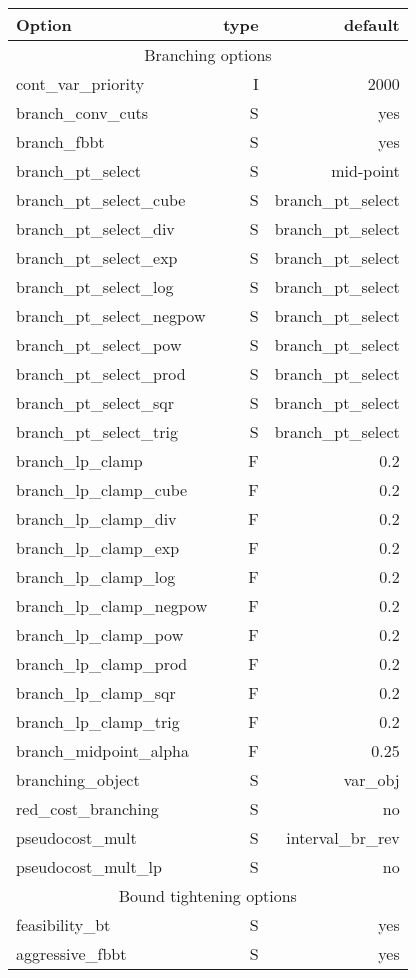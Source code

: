 \begin{center}
\begin{tabular}{|l|r|r|}\hline
Option & type &  default \\
\hline
\hline
\multicolumn{3}{|c|}{Branching options}\\
\hline
cont\_var\_priority& I& 2000\\
branch\_conv\_cuts& S& yes\\
branch\_fbbt& S& yes\\
branch\_pt\_select& S& mid-point\\
branch\_pt\_select\_cube& S& branch\_pt\_select\\
branch\_pt\_select\_div& S& branch\_pt\_select\\
branch\_pt\_select\_exp& S& branch\_pt\_select\\
branch\_pt\_select\_log& S& branch\_pt\_select\\
branch\_pt\_select\_negpow& S& branch\_pt\_select\\
branch\_pt\_select\_pow& S& branch\_pt\_select\\
branch\_pt\_select\_prod& S& branch\_pt\_select\\
branch\_pt\_select\_sqr& S& branch\_pt\_select\\
branch\_pt\_select\_trig& S& branch\_pt\_select\\
branch\_lp\_clamp& F& 0.2\\
branch\_lp\_clamp\_cube& F& 0.2\\
branch\_lp\_clamp\_div& F& 0.2\\
branch\_lp\_clamp\_exp& F& 0.2\\
branch\_lp\_clamp\_log& F& 0.2\\
branch\_lp\_clamp\_negpow& F& 0.2\\
branch\_lp\_clamp\_pow& F& 0.2\\
branch\_lp\_clamp\_prod& F& 0.2\\
branch\_lp\_clamp\_sqr& F& 0.2\\
branch\_lp\_clamp\_trig& F& 0.2\\
branch\_midpoint\_alpha& F& 0.25\\
branching\_object& S& var\_obj\\
red\_cost\_branching& S& no\\
pseudocost\_mult& S& interval\_br\_rev\\
pseudocost\_mult\_lp& S& no\\\hline
\multicolumn{3}{|c|}{Bound tightening options}\\
\hline
feasibility\_bt& S& yes\\
aggressive\_fbbt& S& yes\\

\end{tabular}
\end{center}
